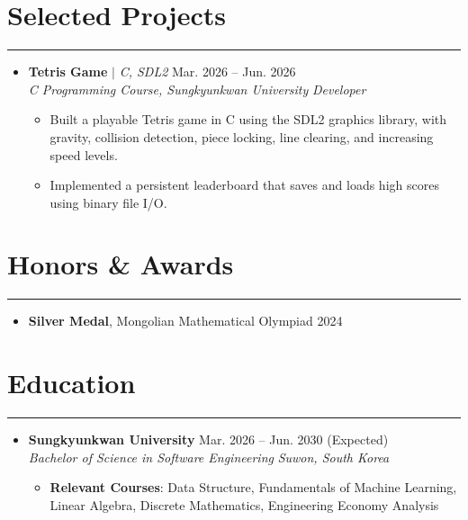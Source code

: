 \documentclass[letterpaper,10pt]{article}
\begin{document}
\section*{Selected Projects}
\hrule
\vspace{4pt}
\begin{itemize}
    \item[]
    \textbf{Tetris Game} $|$ \textit{C, SDL2} \hfill Mar. 2026 -- Jun. 2026 \\
    \textit{C Programming Course, Sungkyunkwan University} \hfill \textit{Developer}
    \begin{itemize}
        \item Built a playable Tetris game in C using the SDL2 graphics library, with gravity, collision detection, piece locking, line clearing, and increasing speed levels.
        \item Implemented a persistent leaderboard that saves and loads high scores using binary file I/O.
    \end{itemize}
\end{itemize}

\section*{Honors \& Awards}
\hrule
\vspace{4pt}
\begin{itemize}
    \item[] \textbf{Silver Medal}, Mongolian Mathematical Olympiad \hfill 2024
\end{itemize}

\section*{Education}
\hrule
\vspace{4pt}
\begin{itemize}
    \item[]
    \textbf{Sungkyunkwan University} \hfill Mar. 2026 -- Jun. 2030 (Expected) \\
    \textit{Bachelor of Science in Software Engineering} \hfill \textit{Suwon, South Korea}
    \begin{itemize}
        \item \textbf{Relevant Courses}: Data Structure, Fundamentals of Machine Learning, Linear Algebra, Discrete Mathematics, Engineering Economy Analysis
    \end{itemize}
\end{itemize}
\vspace{4pt}

\end{document}
